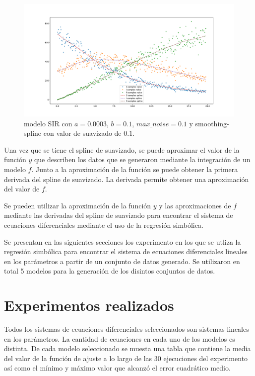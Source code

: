 \begin{figure}[h]
    \centering
    \includegraphics[width=\textwidth]{"figures/SIR_noise_with_spline.pdf"}
    \caption{modelo SIR con $a = 0.0003$, $b = 0.1$, $max\_noise = 0.1$ y smoothing-spline con valor de suavizado de $0.1$.}
    \label{fig:SIR_noise_with_spline}
\end{figure}

Una vez que se tiene el spline de suavizado, se puede aproximar el valor de la función $y$ que describen los datos que se generaron mediante la integración de un modelo $f$. Junto a la aproximación de la función se puede obtener la primera derivada del spline de suavizado. La derivada permite obtener una aproximación del valor de $f$.

Se pueden utilizar la aproximación de la función $y$ y las aproximaciones de $f$ mediante las derivadas del spline de suavizado para encontrar el sistema de ecuaciones diferenciales mediante el uso de la regresión simbólica.

Se presentan en las siguientes secciones los experimento en los que se utliza la regresión simbólica para encontrar el sistema de ecuaciones diferenciales lineales en los parámetros a partir de un conjunto de datos generado. Se utilizaron en total 5 modelos para la generación de los disintos conjuntos de datos.

\section{Experimentos realizados}\label{section:experiments}

Todos los sistemas de ecuaciones diferenciales seleccionados son sistemas lineales en los parámetros. La cantidad de ecuaciones en cada uno de los modelos es distinta. De cada modelo seleccionado se muesta una tabla que contiene la media del valor de la función de ajuste a lo largo de las 30 ejecuciones del experimento así como el mínimo y máximo valor que alcanzó el error cuadrático medio.


